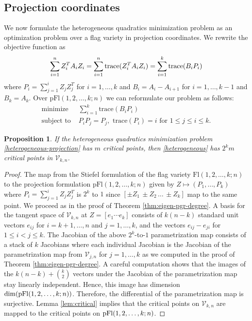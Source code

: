 \documentclass[12pt]{extarticle}
\newtheorem{proposition}[theorem]{Proposition}
\theoremstyle{definition}
\numberwithin{theorem}{section}
\begin{document}
\subsection{Projection coordinates}
We now formulate the heterogeneous quadratics minimization problem as an optimization problem over a flag variety in projection coordinates.
We rewrite the objective function as
\begin{align*}
   \sum_{i = 1}^n Z_i^T  A_i Z_i = \sum_{i = 1}^n {\rm trace}(Z_i^T  A_i Z_i) = \sum_{i = 1}^k \textrm{trace}(B_i P_i) 
\end{align*}
where $P_i = \sum_{j=1}^i Z_j Z_j^T$ for $i =1 ,\ldots, k$ and $B_i = A_i - A_{i+1}$ for $i = 1, \ldots, k-1$ and $B_k = A_k$. 
Over $\mathrm{pFl}(1,2,\ldots, k;n)$ we can reformulate our problem as follows:
\begin{align} \label{heterogeneous-projection}
  \textrm{minimize } &\sum_{i=1}^k \textrm{trace}(B_iP_i)\\
  \nonumber
  \textrm{subject to } 
  &P_iP_j = P_j,\,\,\textrm{trace}(P_i) = i \textrm{ for } 1\leq j \leq  i \leq k.
\end{align}

\begin{proposition}
    If the heterogeneous quadratics minimization problem \eqref{heterogeneous-projection} has $m$ critical points, then \eqref{heterogeneous} has $2^k m$ critical points in $\mathcal V_{k,n}$.
\end{proposition}
\begin{proof}
The map from the Stiefel formulation of the flag variety $\mathrm{Fl}(1,2,\ldots, k;n)$ to the projection formulation $\mathrm{pFl}(1,2,\ldots,k;n)$  given by
$Z \mapsto (P_1, \ldots, P_k)$ where $P_i = \sum_{j=1}^i Z_jZ_j^T$
is $2^k$ to $1$ since $[\pm Z_1 \, \pm Z_2 \, \ldots \, \pm Z_k]$ map to the same point. We proceed as in the proof of Theorem \ref{thm:eigen-pgr-degree}. A basis for the tangent space of $\mathcal V_{k,n}$ at $Z = [e_1 \cdots e_k]$ 
consists of  $k(n-k)$ standard unit vectors $e_{ij}$ for $i=k+1, \ldots, n$ and $j=1, \ldots, k$, and the vectors $e_{ij}-e_{ji}$ for $1 \leq i < j \leq k$. The Jacobian of the above $2^k$-to-$1$ parametrization map consists of a stack of $k$ Jacobians where each individual Jacobian is the Jacobian of the parametrization map from $\mathcal V_{j,n}$ for $j=1, \ldots, k$ as we computed in the proof of Theorem \ref{thm:eigen-pgr-degree}. A careful computation shows that the images of the $k(n-k) + \binom{k}{2}$ vectors under the Jacobian of the parametrization map stay linearly independent. Hence, this image has dimension $\dim({\rm pFl}(1,2,\ldots, k;n))$. Therefore, the differential of the parametrization map is surjective. Lemma \ref{lem:critical} implies that the critical points on $\mathcal V_{k,n}$ are mapped to the critical points on ${\rm pFl}(1,2,\ldots, k;n)$. 
\end{proof}
\end{document}
